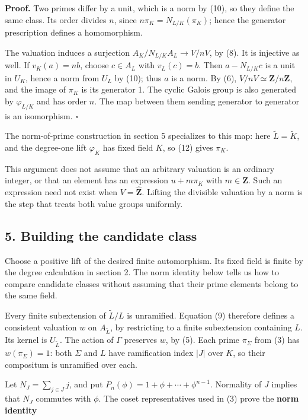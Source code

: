 \documentclass[11pt,a4paper]{article}
\begin{document}
\textbf{Proof.} Two primes differ by a unit, which is a norm by (10), so
they define the same class. Its order divides \(n\), since
\(n\pi_K=N_{L/K}(\pi_K)\); hence the generator prescription defines a
homomorphism.

The valuation induces a surjection \(A_K/N_{L/K}A_L\to V/nV\), by (8).
It is injective as well. If \(v_K(a)=nb\), choose \(c\in A_L\) with
\(v_L(c)=b\). Then \(a-N_{L/K}c\) is a unit in \(U_K\), hence a norm
from \(U_L\) by (10); thus \(a\) is a norm. By (6),
\(V/nV\simeq\mathbf Z/n\mathbf Z\), and the image of \(\pi_K\) is its
generator 1. The cyclic Galois group is also generated by
\(\varphi_{L/K}\) and has order \(n\). The map between them sending
generator to generator is an isomorphism. \(\square\)

The norm-of-prime construction in section 5 specializes to this map:
here \(\widetilde L=\widetilde K\), and the degree-one lift
\(\varphi_K\) has fixed field \(K\), so (12) gives \(\pi_K\).

This argument does not assume that an arbitrary valuation is an ordinary
integer, or that an element has an expression \(u+m\pi_K\) with
\(m\in\mathbf Z\). Such an expression need not exist when
\(V=\widehat{\mathbf Z}\). Lifting the divisible valuation by a norm is
the step that treats both value groups uniformly.

\subsection{5. Building the candidate
class}\label{building-the-candidate-class}

Choose a positive lift of the desired finite automorphism. Its fixed
field is finite by the degree calculation in section 2. The norm
identity below tells us how to compare candidate classes without
assuming that their prime elements belong to the same field.

Every finite subextension of \(\widetilde L/L\) is unramified. Equation
(9) therefore defines a consistent valuation \(w\) on
\(A_{\widetilde L}\), by restricting to a finite subextension containing
\(L\). Its kernel is \(U_{\widetilde L}\). The action of \(\Gamma\)
preserves \(w\), by (5). Each prime \(\pi_\Sigma\) from (3) has
\(w(\pi_\Sigma)=1\): both \(\Sigma\) and \(L\) have ramification index
\(|J|\) over \(K\), so their compositum is unramified over each.

Let \(N_J=\sum_{j\in J}j\), and put
\(P_n(\phi)=1+\phi+\cdots+\phi^{n-1}\). Normality of \(J\) implies that
\(N_J\) commutes with \(\phi\). The coset representatives used in (3)
prove the \textbf{norm identity}
\end{document}
